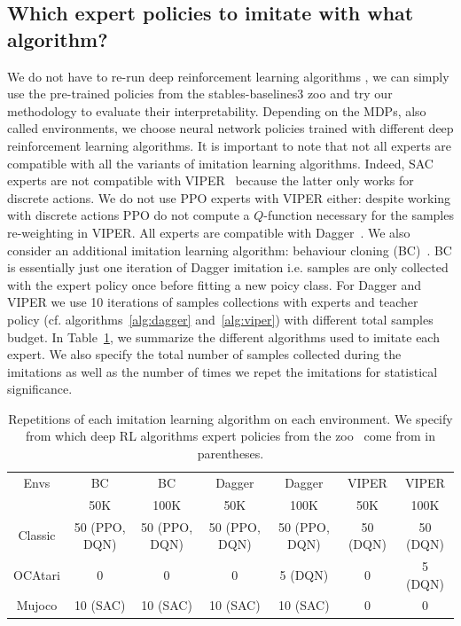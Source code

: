 \subsection{Which expert policies to imitate with what algorithm?}
We do not have to re-run deep reinforcement learning algorithms \cite{dqn,ppo,deep-rl-relu1}, we can simply use the pre-trained policies from the stables-baselines3 zoo \cite{zoo} and try our methodology to evaluate their interpretability.
Depending on the MDPs, also called environments, we choose neural network policies trained with different deep reinforcement learning algorithms.
It is important to note that not all experts are compatible with all the variants of imitation learning algorithms.
Indeed, SAC experts \cite{deep-rl-relu1} are not compatible with VIPER~\cite{viper} because the latter only works for discrete actions.
We do not use PPO experts with VIPER either: despite working with discrete actions PPO do not compute a $Q$-function necessary for the samples re-weighting in VIPER.
All experts are compatible with Dagger~\cite{dagger}.
We also consider an additional imitation learning algorithm: behaviour cloning (BC)~\cite{behavior-cloning}.
BC is essentially just one iteration of Dagger imitation i.e. samples are only collected with the expert policy once before fitting a new poicy class.
For Dagger and VIPER we use 10 iterations of samples collections with experts and teacher policy (cf. algorithms~\ref{alg:dagger} and~\ref{alg:viper}) with different total samples budget.
In Table~\ref{tab:repet-distill}, we summarize the different algorithms used to imitate each expert.
We also specify the total number of samples collected during the imitations as well as the number of times we repet the imitations for statistical significance.

\begin{table}
  \centering
  \footnotesize
  \begin{tabular}{c|cccccc}
  \toprule
  Envs & BC & BC & Dagger & Dagger & VIPER & VIPER\\
   & 50K & 100K & 50K & 100K & 50K & 100K\\
  \midrule
  Classic& 50 (PPO, DQN)& 50 (PPO, DQN)& 50 (PPO, DQN)& 50 (PPO, DQN)&  50 (DQN) & 50 (DQN)\\
  OCAtari& 0 & 0 & 0 & 5 (DQN)&  0 & 5 (DQN)\\
  Mujoco& 10 (SAC)& 10 (SAC)& 10 (SAC)& 10 (SAC)&  0 & 0\\
  \bottomrule
  \end{tabular}
  \caption{Repetitions of each imitation learning algorithm on each environment. We specify from which deep RL algorithms expert policies from the zoo~\cite{zoo} come from in parentheses.}
  \label{tab:repet-distill}
\end{table}

